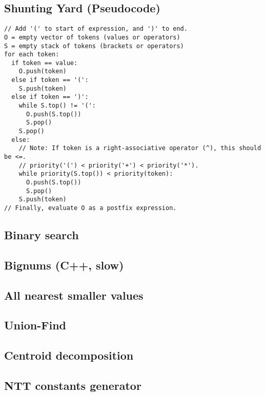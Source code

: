 \documentclass[9pt]{extarticle}
\begin{document}
\begin{multicols*}{3}
\subsection{Shunting Yard (Pseudocode)} %
\begin{lstlisting}
// Add '(' to start of expression, and ')' to end.
O = empty vector of tokens (values or operators)
S = empty stack of tokens (brackets or operators)
for each token:
  if token == value:
    O.push(token)
  else if token == '(':
    S.push(token)
  else if token == ')':
    while S.top() != '(':
      O.push(S.top())
      S.pop()
    S.pop()
  else:
    // Note: If token is a right-associative operator (^), this should be <=.
	// priority('(') < priority('+') < priority('*').
    while priority(S.top()) < priority(token):
      O.push(S.top())
      S.pop()
    S.push(token)
// Finally, evaluate O as a postfix expression.
\end{lstlisting}

\subsection{Binary search} %


\subsection{Bignums (C++, slow)} %


\subsection{All nearest smaller values} %


\subsection{Union-Find}


\subsection{Centroid decomposition}


\subsection{NTT constants generator}



\end{multicols*}
\end{document}
